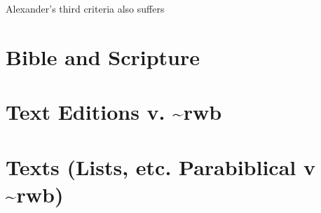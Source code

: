 Alexander's third criteria also suffers

\section{Bible and Scripture}\label{bible-and-scripture}

\section{Text Editions v.
\textasciitilde{}rwb}\label{text-editions-v.-rwb}

\section*{Texts (Lists, etc. Parabiblical v
\textasciitilde{}rwb)}\label{texts-lists-etc.-parabiblical-v-rwb}
